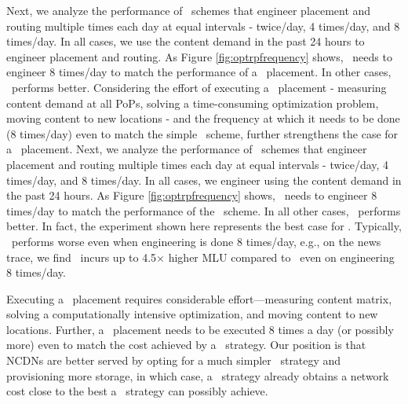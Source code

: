 \eat
{
Next, we analyze the performance of \planned\ schemes that engineer placement and routing multiple times each day at equal intervals - twice/day, 4 times/day, and 8 times/day. In all cases, we use the content demand in the past 24 hours to engineer placement and routing. As Figure \ref{fig:optrpfrequency} shows, \optrp\ needs to engineer 8 times/day to match the performance of a \unplanned\ placement. 
In other cases, \invlru\ performs better. Considering the effort of executing a \planned\ placement - measuring content demand at all PoPs, solving a time-consuming optimization problem, moving content to new locations - and the frequency at which it needs to be done (8 times/day)  even to match the simple \invlru\ scheme, further strengthens the case for a \unplanned\ placement. 
}
Next, we analyze the performance of \planned\ schemes that engineer placement and routing multiple times each day at equal intervals - twice/day, 4 times/day, and 8 times/day. In all cases, we engineer using the content demand in the past 24 hours. As Figure \ref{fig:optrpfrequency} shows, \optrp\ needs to engineer 8 times/day to match the performance of the \invlru\ scheme. In all other cases, \invlru\ performs better.  In fact, the experiment shown here represents the best case for \optrp. Typically, \optrp\ performs worse even when engineering is done 8 times/day, e.g., on the news trace, we find \optrp\ incurs up to 4.5$\times$ higher MLU compared to \invlru\ even on engineering 8 times/day.


Executing a \planned\ placement requires considerable effort---measuring content matrix, solving a computationally intensive optimization, and moving content to new locations. Further, a \planned\ placement needs to be executed  8 times a day (or possibly more) even to match the cost achieved by a \unplanned\ strategy. Our position is that NCDNs are better served by opting for a much simpler \unplanned\ strategy and provisioning more storage, in which case, a \unplanned\ strategy  already obtains a network cost close to the best a \planned\ strategy can possibly achieve.



